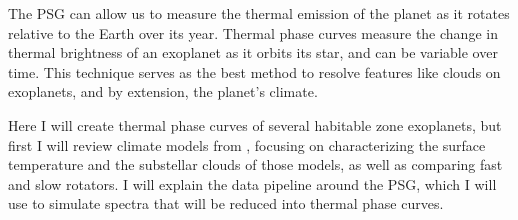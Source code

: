 The PSG can allow us to measure the
 thermal emission of the planet as it rotates relative to the Earth over its
 year. Thermal phase curves measure the change in thermal brightness of an
 exoplanet as it orbits its star, and can be variable over time. This technique
 serves as the best method to resolve features like clouds on exoplanets, and
 by extension, the planet's climate.

Here I will create thermal phase curves
 of several habitable zone exoplanets, but first I will review climate models
 from \citet{wolf17, wolf18}, focusing on characterizing the surface temperature
 and the substellar
 clouds of those models, as well as comparing fast and slow rotators. I
 will explain the data pipeline around the PSG, which I will use to simulate
 spectra that will be reduced into thermal phase curves.
